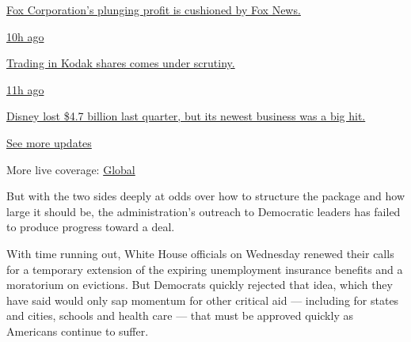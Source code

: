\href{https://www.nytimes.com/live/2020/08/04/business/stock-market-today-coronavirus?action=click\&pgtype=Article\&state=default\&region=MAIN_CONTENT_1\&context=storylines_live_updates\#fox-corporations-plunging-profit-is-cushioned-by-fox-news}{Fox
Corporation's plunging profit is cushioned by Fox News.}

\href{https://www.nytimes.com/live/2020/08/04/business/stock-market-today-coronavirus?action=click\&pgtype=Article\&state=default\&region=MAIN_CONTENT_1\&context=storylines_live_updates\#trading-in-kodak-shares-comes-under-scrutiny}{10h
ago}

\href{https://www.nytimes.com/live/2020/08/04/business/stock-market-today-coronavirus?action=click\&pgtype=Article\&state=default\&region=MAIN_CONTENT_1\&context=storylines_live_updates\#trading-in-kodak-shares-comes-under-scrutiny}{Trading
in Kodak shares comes under scrutiny.}

\href{https://www.nytimes.com/live/2020/08/04/business/stock-market-today-coronavirus?action=click\&pgtype=Article\&state=default\&region=MAIN_CONTENT_1\&context=storylines_live_updates\#disney-lost-4-7-billion-last-quarter-but-its-newest-business-was-a-big-hit}{11h
ago}

\href{https://www.nytimes.com/live/2020/08/04/business/stock-market-today-coronavirus?action=click\&pgtype=Article\&state=default\&region=MAIN_CONTENT_1\&context=storylines_live_updates\#disney-lost-4-7-billion-last-quarter-but-its-newest-business-was-a-big-hit}{Disney
lost \$4.7 billion last quarter, but its newest business was a big hit.}

\href{https://www.nytimes.com/live/2020/08/04/business/stock-market-today-coronavirus?action=click\&pgtype=Article\&state=default\&region=MAIN_CONTENT_1\&context=storylines_live_updates}{See
more updates}

More live coverage:
\href{https://www.nytimes.com/2020/08/04/world/coronavirus-cases.html?action=click\&pgtype=Article\&state=default\&region=MAIN_CONTENT_1\&context=storylines_live_updates}{Global}

But with the two sides deeply at odds over how to structure the package
and how large it should be, the administration's outreach to Democratic
leaders has failed to produce progress toward a deal.

With time running out, White House officials on Wednesday renewed their
calls for a temporary extension of the expiring unemployment insurance
benefits and a moratorium on evictions. But Democrats quickly rejected
that idea, which they have said would only sap momentum for other
critical aid --- including for states and cities, schools and health
care --- that must be approved quickly as Americans continue to suffer.

